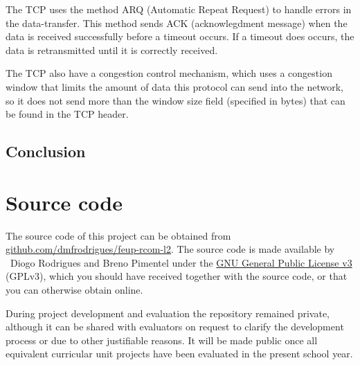 \documentclass[a4paper, 11pt]{report}
\begin{document}
The TCP uses the method ARQ (Automatic Repeat Request) to handle errors in the data-transfer.
This method sends ACK (acknowlegdment message) when the data is received successfully before a timeout occurs.
If a timeout does occurs, the data is retransmitted until it is correctly received.

The TCP also have a congestion control mechanism, which uses a congestion window that limits the amount of data this protocol can send into the network, 
so it does not send more than the window size field (specified in bytes) that can be found in the TCP header. 

\section*{Conclusion} \label{sec:Conclusion}




\appendix
\appendixpage
\addappheadtotoc
\chapter{Source code}

The source code of this project can be obtained from \href{https://github.com/dmfrodrigues/feup-rcom-l2}{github.com/dmfrodrigues/feup-rcom-l2}.
The source code is made available by \textcopyright~Diogo Rodrigues and Breno Pimentel under the \href{https://www.gnu.org/licenses/gpl-3.0.en.html}{GNU General Public License v3} (GPLv3), which you should have received together with the source code, or that you can otherwise obtain online.

During project development and evaluation the repository remained private, although it can be shared with evaluators on request to clarify the development process or due to other justifiable reasons.
It will be made public once all equivalent curricular unit projects have been evaluated in the present school year.

\fancyhfoffset{0pt}






\end{document}
